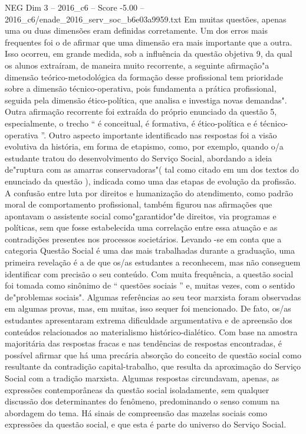 \begin{textsample}{NEG Dim 3 – 2016\_c6 – Score -5.00 – 2016\_c6/enade\_2016\_serv\_soc\_b6e03a9959.txt}
Em muitas questões, apenas uma ou duas dimensões eram definidas corretamente.
Um dos erros mais frequentes foi o de afirmar que uma dimensão era mais importante que a outra.
Isso ocorreu, em grande medida, sob a influência da questão objetiva 9, da qual os alunos extraíram, de maneira muito recorrente, a seguinte afirmação"a dimensão teórico-metodológica da formação desse profissional tem prioridade sobre a dimensão técnico-operativa, pois fundamenta a prática profissional, seguida pela dimensão ético-política, que analisa e investiga novas demandas".
Outra afirmação recorrente foi extraída do próprio enunciado da questão 5, especialmente, o trecho “ é conceitual, é formativa, é ético-política e é técnico-operativa ”.
Outro aspecto importante identificado nas respostas foi a visão evolutiva da história, em forma de etapismo, como, por exemplo, quando o/a estudante tratou do desenvolvimento do Serviço Social, abordando a ideia de"ruptura com as amarras conservadoras"( tal como citado em um dos textos do enunciado da questão ), indicada como uma das etapas de evolução da profissão.
A confusão entre luta por direitos e humanização do atendimento, como padrão moral de comportamento profissional, também figurou nas afirmações que apontavam o assistente social como"garantidor"de direitos, via programas e políticas, sem que fosse estabelecida uma correlação entre essa atuação e as contradições presentes nos processos societários.
Levando -se em conta que a categoria Questão Social é uma das mais trabalhadas durante a graduação, uma primeira revelação é a de que os/as estudantes a reconhecem, mas não conseguem identificar com precisão o seu conteúdo.
Com muita frequência, a questão social foi tomada como sinônimo de “ questões sociais ” e, muitas vezes, com o sentido de"problemas sociais".
Algumas referências ao seu teor marxista foram observadas em algumas provas, mas, em muitas, isso sequer foi mencionado.
De fato, os/as estudantes apresentaram extrema dificuldade argumentativa e de apreensão dos conteúdos relacionados ao materialismo histórico-dialético.
Com base na amostra majoritária das respostas fracas e nas tendências de respostas encontradas, é possível afirmar que há uma precária absorção do conceito de questão social como resultante da contradição capital-trabalho, que resulta da aproximação do Serviço Social com a tradição marxista.
Algumas respostas circundavam, apenas, as expressões contemporâneas da questão social isoladamente, sem qualquer discussão dos determinantes do fenômeno, predominando o senso comum na abordagem do tema.
Há sinais de compreensão das mazelas sociais como expressões da questão social, e que esta é parte do universo do Serviço Social.

\end{textsample}
